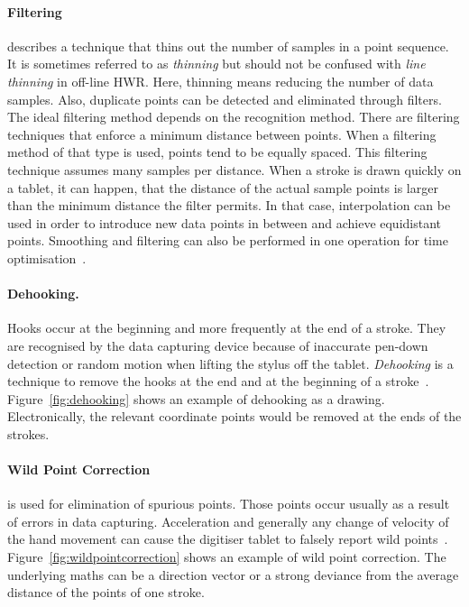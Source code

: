 \paragraph{Filtering}
\label{sec:filtering}
describes a technique that thins out the number of samples in 
a point sequence. It is sometimes referred to as \emph{thinning} but should not 
be confused with \emph{line thinning} in off-line HWR. Here, thinning means 
reducing the number of data samples. Also, duplicate points can be detected
and eliminated through filters.
The ideal filtering method depends on the recognition method. There are 
filtering techniques that enforce a minimum distance between points. When a 
filtering method of that type is used, points tend to be equally spaced.
This filtering technique assumes many samples per distance. When a stroke is 
drawn quickly on a tablet, it can happen, that the distance of the actual sample 
points is larger than the minimum distance the filter permits. In that case,
interpolation can be used in order to introduce new data points in between and
achieve equidistant points. Smoothing and filtering can also be performed in one 
operation for time optimisation~.

\paragraph{Dehooking.}
\label{sec:dehooking}
Hooks occur at the beginning and more frequently at the end of a stroke. They
are recognised by the data capturing device because of inaccurate pen-down 
detection or random motion when lifting the stylus off the tablet.
\emph{Dehooking} is a technique to remove the hooks at the end and at the 
beginning of a stroke~. Figure~\ref{fig:dehooking} shows
an example of dehooking as a drawing. Electronically, the relevant coordinate
points would be removed at the ends of the strokes.

\paragraph{Wild Point Correction}
\label{sec:wildpointcorrection}
is used for elimination of spurious points. Those 
points occur usually as a result of errors in data capturing. Acceleration and 
generally any change of velocity of the hand movement can cause the digitiser 
tablet to falsely report wild points~.
Figure~\ref{fig:wildpointcorrection} shows an example of wild point correction.
The underlying maths can be a direction vector or a strong deviance from the
average distance of the points of one stroke.

